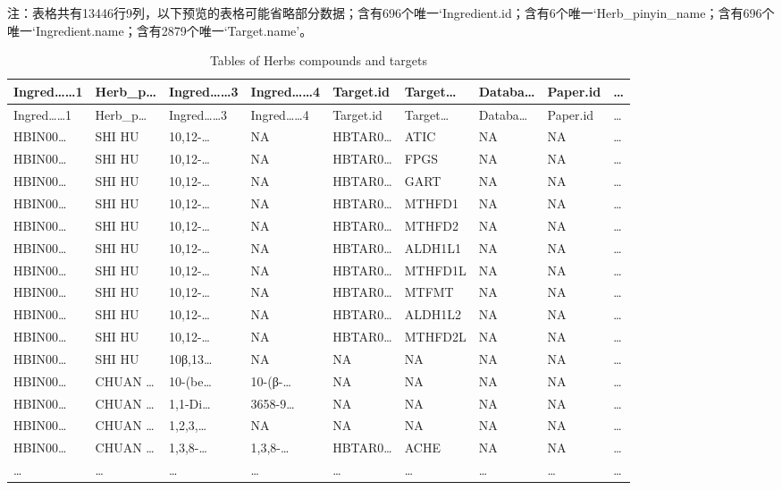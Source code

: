 \documentclass[
]{article}
\begin{document}
\begin{center}\begin{tcolorbox}[colback=gray!10, colframe=gray!50, width=0.9\linewidth, arc=1mm, boxrule=0.5pt]注：表格共有13446行9列，以下预览的表格可能省略部分数据；含有696个唯一`Ingredient.id；含有6个唯一`Herb\_pinyin\_name；含有696个唯一`Ingredient.name；含有2879个唯一`Target.name'。
\end{tcolorbox}
\end{center}

\begin{longtable}[]{@{}lllllllll@{}}
\caption{\label{tab:tables-of-Herbs-compounds-and-targets}Tables of Herbs compounds and targets}\tabularnewline
\toprule
Ingred\ldots\ldots1 & Herb\_p\ldots{} & Ingred\ldots\ldots3 & Ingred\ldots\ldots4 & Target.id & Target\ldots{} & Databa\ldots{} & Paper.id & \ldots{}\tabularnewline
\midrule
\endfirsthead
\toprule
Ingred\ldots\ldots1 & Herb\_p\ldots{} & Ingred\ldots\ldots3 & Ingred\ldots\ldots4 & Target.id & Target\ldots{} & Databa\ldots{} & Paper.id & \ldots{}\tabularnewline
\midrule
\endhead
HBIN00\ldots{} & SHI HU & 10,12-\ldots{} & NA & HBTAR0\ldots{} & ATIC & NA & NA & \ldots{}\tabularnewline
HBIN00\ldots{} & SHI HU & 10,12-\ldots{} & NA & HBTAR0\ldots{} & FPGS & NA & NA & \ldots{}\tabularnewline
HBIN00\ldots{} & SHI HU & 10,12-\ldots{} & NA & HBTAR0\ldots{} & GART & NA & NA & \ldots{}\tabularnewline
HBIN00\ldots{} & SHI HU & 10,12-\ldots{} & NA & HBTAR0\ldots{} & MTHFD1 & NA & NA & \ldots{}\tabularnewline
HBIN00\ldots{} & SHI HU & 10,12-\ldots{} & NA & HBTAR0\ldots{} & MTHFD2 & NA & NA & \ldots{}\tabularnewline
HBIN00\ldots{} & SHI HU & 10,12-\ldots{} & NA & HBTAR0\ldots{} & ALDH1L1 & NA & NA & \ldots{}\tabularnewline
HBIN00\ldots{} & SHI HU & 10,12-\ldots{} & NA & HBTAR0\ldots{} & MTHFD1L & NA & NA & \ldots{}\tabularnewline
HBIN00\ldots{} & SHI HU & 10,12-\ldots{} & NA & HBTAR0\ldots{} & MTFMT & NA & NA & \ldots{}\tabularnewline
HBIN00\ldots{} & SHI HU & 10,12-\ldots{} & NA & HBTAR0\ldots{} & ALDH1L2 & NA & NA & \ldots{}\tabularnewline
HBIN00\ldots{} & SHI HU & 10,12-\ldots{} & NA & HBTAR0\ldots{} & MTHFD2L & NA & NA & \ldots{}\tabularnewline
HBIN00\ldots{} & SHI HU & 10β,13\ldots{} & NA & NA & NA & NA & NA & \ldots{}\tabularnewline
HBIN00\ldots{} & CHUAN \ldots{} & 10-(be\ldots{} & 10-(β-\ldots{} & NA & NA & NA & NA & \ldots{}\tabularnewline
HBIN00\ldots{} & CHUAN \ldots{} & 1,1-Di\ldots{} & 3658-9\ldots{} & NA & NA & NA & NA & \ldots{}\tabularnewline
HBIN00\ldots{} & CHUAN \ldots{} & 1,2,3,\ldots{} & NA & NA & NA & NA & NA & \ldots{}\tabularnewline
HBIN00\ldots{} & CHUAN \ldots{} & 1,3,8-\ldots{} & 1,3,8-\ldots{} & HBTAR0\ldots{} & ACHE & NA & NA & \ldots{}\tabularnewline
\ldots{} & \ldots{} & \ldots{} & \ldots{} & \ldots{} & \ldots{} & \ldots{} & \ldots{} & \ldots{}\tabularnewline
\bottomrule
\end{longtable}
\end{document}
